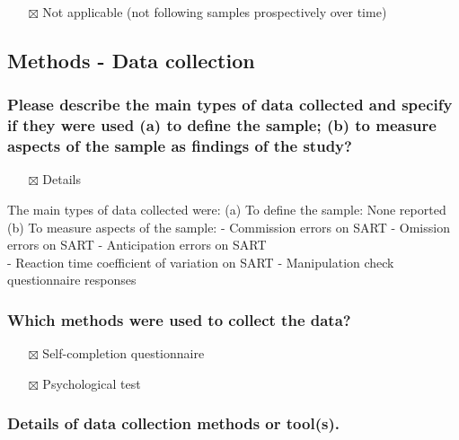 \documentclass[
  doc, a4paper]{apa7}
\providecommand{\tightlist}{%
  \setlength{\itemsep}{0pt}\setlength{\parskip}{0pt}}
\begin{document}
\begin{itemize}
\tightlist
\item[$\boxtimes$]
  Not applicable (not following samples prospectively over time)
\end{itemize}

\subsection{Methods - Data collection}\label{methods---data-collection}

\subsubsection{Please describe the main types of data collected and specify if they were used (a) to define the sample; (b) to measure aspects of the sample as findings of the study?}\label{please-describe-the-main-types-of-data-collected-and-specify-if-they-were-used-a-to-define-the-sample-b-to-measure-aspects-of-the-sample-as-findings-of-the-study}

\begin{itemize}
\tightlist
\item[$\boxtimes$]
  Details
\end{itemize}

The main types of data collected were:
(a) To define the sample: None reported
(b) To measure aspects of the sample:
- Commission errors on SART
- Omission errors on SART
- Anticipation errors on SART\\
- Reaction time coefficient of variation on SART
- Manipulation check questionnaire responses

\subsubsection{Which methods were used to collect the data?}\label{which-methods-were-used-to-collect-the-data}

\begin{itemize}
\tightlist
\item[$\boxtimes$]
  Self-completion questionnaire
\item[$\boxtimes$]
  Psychological test
\end{itemize}

\subsubsection{Details of data collection methods or tool(s).}\label{details-of-data-collection-methods-or-tools.}
\end{document}
